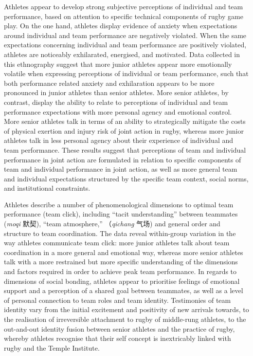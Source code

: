 \begin{CJK}{UTF8}{gbsn}
Athletes appear to develop strong subjective perceptions of individual and team performance, based on attention to specific technical components of rugby game play.   On the one hand, athletes display evidence of anxiety when expectations around individual and team performance are negatively violated.  When the same expectations concerning individual and team performance are positively violated, athletes are noticeably exhilarated, energised, and motivated.  Data collected in this ethnography suggest that more junior athletes appear more emotionally volatile when expressing perceptions of individual or team performance, such that both performance related anxiety and exhilaration appears to be more pronounced in junior athletes than senior athletes.  More senior athletes, by contrast, display the ability to relate to perceptions of individual and team performance expectations with more personal agency and emotional control.  More senior athletes talk in terms of an ability to strategically mitigate the costs of physical exertion and injury risk of joint action in rugby, whereas more junior athletes talk in less personal agency about their experience of individual and team performance.  These results suggest that perceptions of team and individual performance in joint action are formulated in relation to specific components of team and individual performance in joint action, as well as more general team and individual expectations structured by the specific team context, social norms, and institutional constraints.

Athletes describe a number of phenomenological dimensions to optimal team performance (team click), including ``tacit understanding'' between teammates (\textit{moqi} 默契), ``team atmosphere,'' （\textit{qichang} 气场) and general order and structure to team coordination.  The data reveal within-group variation in the way athletes communicate team click: more junior athletes talk about team coordination in a more general and emotional way, whereas more senior athletes talk with a more restrained but more specific understanding of the dimensions and factors required in order to achieve peak team performance.  In regards to dimensions of social bonding, athletes appear to prioritise feelings of emotional support and a perception of a shared goal between teammates, as well as a level of personal connection to team roles and team identity.  Testimonies of team identity vary from the initial excitement and positivity of new arrivals towards, to the realisation of irreversible attachment to rugby of middle-rung athletes, to the out-and-out identity fusion between senior athletes and the practice of rugby, whereby athletes recognise that their self concept is inextricably linked with rugby and the Temple Institute.


\end{CJK}
